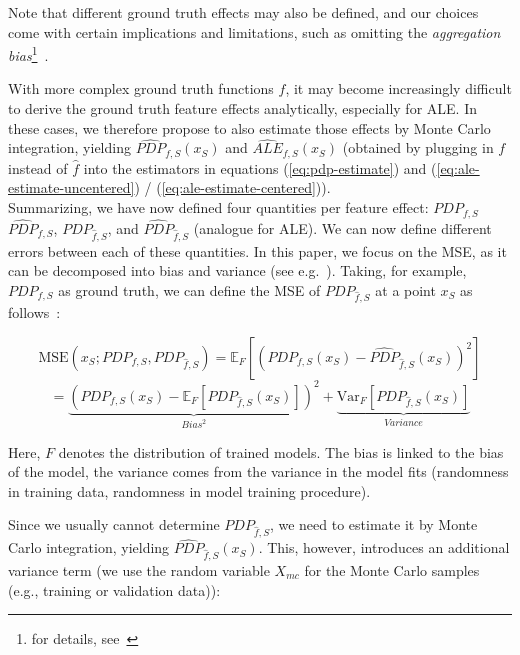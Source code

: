 \documentclass[runningheads]{llncs}
\begin{document}
Note that different ground truth effects may also be defined, and our choices
come with certain implications and limitations, such as omitting the
\textit{aggregation bias}\footnote{for details,
    see~\cite{herbinger_repid_2022}}~\cite{mehrabi_survey_2021}.

With more complex ground truth functions $f$, it may become increasingly
difficult to derive the ground truth feature effects analytically, especially
for ALE. In these cases, we therefore propose to also estimate those effects by
Monte Carlo integration, yielding $\widehat{PDP}_{f,S}(x_S)$ and
$\widehat{ALE}_{f,S}(x_S)$ (obtained by plugging in $f$ instead of $\hat f$
into the estimators in equations (\ref{eq:pdp-estimate}) and
(\ref{eq:ale-estimate-uncentered}) / (\ref{eq:ale-estimate-centered})).\\

\noindent Summarizing, we have now defined four quantities per feature effect:
$PDP_{f,S}$ $\widehat{PDP}_{f,S}$, $PDP_{\hat f,S}$, and $\widehat{PDP}_{\hat f,S}$
(analogue for ALE). We can now define different errors between each of these
quantities. In this paper, we focus on the MSE, as it can be decomposed into
bias and variance (see e.g.~\cite{geman_neural_1992}).
Taking, for example, $PDP_{f,S}$ as ground truth, we can define the MSE of
$PDP_{\hat f,S}$ at a point $x_S$ as follows~\cite{molnar_relating_2023}:

\begin{equation}
    \text{MSE}(x_S; PDP_{f,S}, PDP_{\hat f,S})
    = \mathbb{E}_F[{(PDP_{f,S}(x_S) - \widehat{PDP}_{\hat f,S}(x_S))}^2]
\end{equation}
\begin{equation}
    = \underbrace{{(PDP_{f,S}(x_S) - \mathbb{E}_F[PDP_{\hat{f},S}(x_S)])}^2}_{Bias^2} + \underbrace{\text{Var}_F[PDP_{\hat{f},S}(x_S)]}_{Variance}
\end{equation}

\noindent Here, $F$ denotes the distribution of trained models. The bias
is linked to the bias of the model, the variance comes from the variance
in the model fits (randomness in training data, randomness in model training procedure).

Since we usually cannot determine $PDP_{\hat f,S}$, we need to estimate it by
Monte Carlo integration, yielding $\widehat{PDP}_{\hat f,S}(x_S)$. This,
however, introduces an additional variance term (we use the random variable
$X_{mc}$ for the Monte Carlo samples (e.g., training or validation data)):
\end{document}
